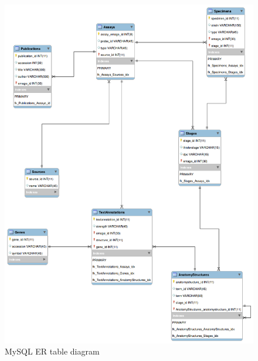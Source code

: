\begin{figure}[H]\begin{center}\includegraphics[width=1\linewidth]{images/emage_erd}\caption{MySQL ER table diagram}\label{fig:mysql}\end{center}\end{figure}

